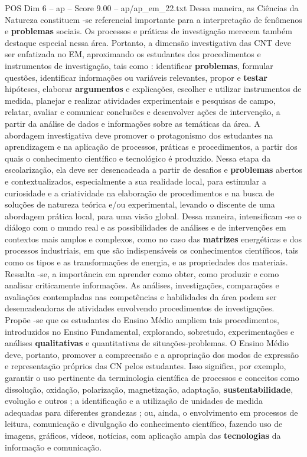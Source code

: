 \begin{textsample}{POS Dim 6 – ap – Score 9.00 – ap/ap\_em\_22.txt}
Dessa maneira, as Ciências da Natureza constituem -se referencial importante para a interpretação de fenômenos e \textbf{problemas} sociais.
Os processos e práticas de investigação merecem também destaque especial nessa área.
Portanto, a dimensão investigativa das CNT deve ser enfatizada no EM, aproximando os estudantes dos procedimentos e instrumentos de investigação, tais como : identificar \textbf{problemas}, formular questões, identificar informações ou variáveis relevantes, propor e \textbf{testar} hipóteses, elaborar \textbf{argumentos} e explicações, escolher e utilizar instrumentos de medida, planejar e realizar atividades experimentais e pesquisas de campo, relatar, avaliar e comunicar conclusões e desenvolver ações de intervenção, a partir da análise de dados e informações sobre as temáticas da área.
A abordagem investigativa deve promover o protagonismo dos estudantes na aprendizagem e na aplicação de processos, práticas e procedimentos, a partir dos quais o conhecimento científico e tecnológico é produzido.
Nessa etapa da escolarização, ela deve ser desencadeada a partir de desafios e \textbf{problemas} abertos e contextualizados, especialmente a sua realidade local, para estimular a curiosidade e a criatividade na elaboração de procedimentos e na busca de soluções de natureza teórica e/ou experimental, levando o discente de uma abordagem prática local, para uma visão global.
Dessa maneira, intensificam -se o diálogo com o mundo real e as possibilidades de análises e de intervenções em contextos mais amplos e complexos, como no caso das \textbf{matrizes} energéticas e dos processos industriais, em que são indispensáveis os conhecimentos científicos, tais como os tipos e as transformações de energia, e as propriedades dos materiais.
Ressalta -se, a importância em aprender como obter, como produzir e como analisar criticamente informações.
As análises, investigações, comparações e avaliações contempladas nas competências e habilidades da área podem ser desencadeadoras de atividades envolvendo procedimentos de investigações.
Propõe -se que os estudantes do Ensino Médio ampliem tais procedimentos, introduzidos no Ensino Fundamental, explorando, sobretudo, experimentações e análises \textbf{qualitativas} e quantitativas de situações-problemas.
O Ensino Médio deve, portanto, promover a compreensão e a apropriação dos modos de expressão e representação próprios das CN pelos estudantes.
Isso significa, por exemplo, garantir o uso pertinente da terminologia científica de processos e conceitos como dissolução, oxidação, polarização, magnetização, adaptação, \textbf{sustentabilidade}, evolução e outros ; a identificação e a utilização de unidades de medida adequadas para diferentes grandezas ; ou, ainda, o envolvimento em processos de leitura, comunicação e divulgação do conhecimento científico, fazendo uso de imagens, gráficos, vídeos, notícias, com aplicação ampla das \textbf{tecnologias} da informação e comunicação.

\end{textsample}
